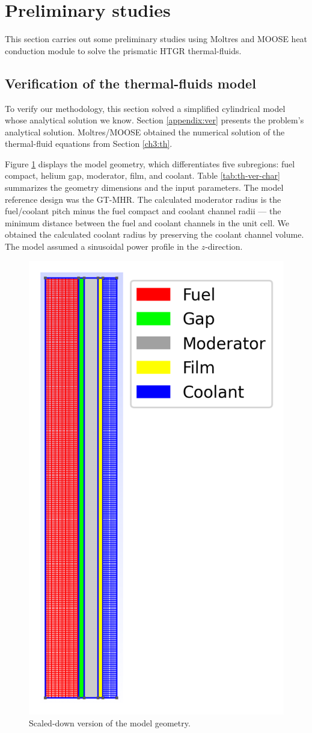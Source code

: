 \label{ch:thermalfluids}

\section{Preliminary studies}

This section carries out some preliminary studies using Moltres and MOOSE heat conduction module to solve the prismatic HTGR thermal-fluids.

\subsection{Verification of the thermal-fluids model}

To verify our methodology, this section solved a simplified cylindrical model whose analytical solution we know.
Section \ref{appendix:ver} presents the problem's analytical solution.
Moltres/MOOSE obtained the numerical solution of the thermal-fluid equations from Section \ref{ch3:th}.

Figure \ref{fig:th-ver-mesh} displays the model geometry, which differentiates five subregions: fuel compact, helium gap, moderator, film, and coolant.
Table \ref{tab:th-ver-char} summarizes the geometry dimensions and the input parameters.
The model reference design was the GT-MHR.
The calculated moderator radius is the fuel/coolant pitch minus the fuel compact and coolant channel radii --- the minimum distance between the fuel and coolant channels in the unit cell.
We obtained the calculated coolant radius by preserving the coolant channel volume.
The model assumed a sinusoidal power profile in the $z$-direction.

\begin{figure}[htbp!]
	\centering
	\includegraphics[width=0.25\linewidth]{figures-thermal/2D-preliminar-mesh2}
	\hfill
	\caption{Scaled-down version of the model geometry.}
	\label{fig:th-ver-mesh}
\end{figure}

